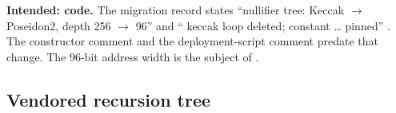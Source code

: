 \begin{specdelta}
\textbf{Intended: code.} The migration record states ``nullifier tree:
Keccak $\to$ Poseidon2, depth 256 $\to$ 96'' and
`` keccak loop deleted;
 constant \ldots{} pinned''
. The
constructor comment and the deployment-script comment predate that change.
The 96-bit address width is the subject of .
\end{specdelta}

\subsection{Vendored recursion tree}
\label{subsec:delta-vendor}


